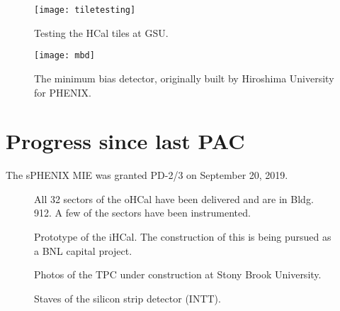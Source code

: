 \begin{figure}[hbt!]
  \centering
  \texttt{[image: tiletesting]}
  \caption{Testing the HCal tiles at GSU.}
  \label{fig:tiletesting}
\end{figure}

\begin{figure}[hbt!]
  \centering
  \texttt{[image: mbd]}
  \caption{The minimum bias detector, originally built by Hiroshima
    University for PHENIX.}
  \label{fig:mbd}
\end{figure}




\section{Progress since last PAC}
\label{sec:progress}

The sPHENIX MIE was granted PD-2/3 on September 20, 2019.

\begin{figure}[!hbt]
 \begin{center}
        \caption{\label{fig:ohcal}All 32 sectors of the oHCal have
        been delivered and are in Bldg. 912.  A few of the sectors have
        been instrumented.}
 \end{center}
\end{figure}

\begin{figure}[!hbt]
 \begin{center}
        \caption{\label{fig:ihcal}Prototype of the iHCal.  The
        construction of this is being pursued as a BNL capital project.}
 \end{center}
\end{figure}

\begin{figure}[!hbt]
 \begin{center}
        \caption{\label{fig:tpc}Photos of the TPC under construction
        at Stony Brook University.}
 \end{center}
\end{figure}

\begin{figure}[!hbt]
 \begin{center}
        \caption{\label{fig:intt}Staves of the silicon strip detector (INTT).}
 \end{center}
\end{figure}

